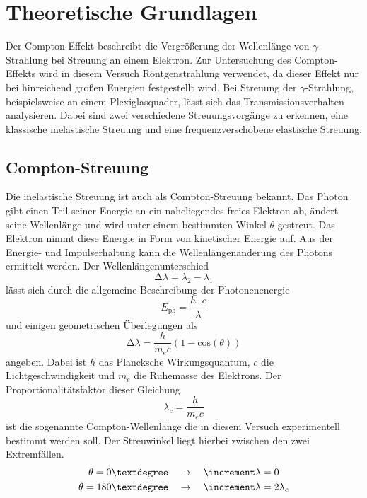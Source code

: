 \section{Theoretische Grundlagen}
Der Compton-Effekt beschreibt die Vergrößerung der Wellenlänge von $\gamma$-Strahlung bei Streuung an einem Elektron. Zur Untersuchung
des Compton-Effekts wird in diesem Versuch Röntgenstrahlung verwendet, da dieser Effekt nur bei hinreichend großen Energien festgestellt wird.
Bei Streuung der $\gamma$-Strahlung, beispielsweise an einem Plexiglasquader, lässt sich das Transmissionsverhalten analysieren. Dabei
sind zwei verschiedene Streuungsvorgänge zu erkennen, eine klassische inelastische Streuung und eine frequenzverschobene elastische Streuung.
\\
\subsection{Compton-Streuung}
Die inelastische Streuung ist auch als Compton-Streuung bekannt. Das Photon gibt einen Teil seiner Energie an ein naheliegendes freies Elektron ab, ändert seine Wellenlänge und wird unter einem 
bestimmten Winkel $\theta$ gestreut. Das Elektron nimmt diese Energie in Form von kinetischer Energie auf. Aus der Energie- und Impulserhaltung kann die Wellenlängenänderung des Photons ermittelt werden.
Der Wellenlängenunterschied
\begin{equation}
\label{eqn:diff}
\increment \lambda = \lambda_{2} - \lambda_{1}
\end{equation}
lässt sich durch die allgemeine Beschreibung der Photonenenergie
\begin{equation}
\label{eqn:photoneneq}
E_{\text{ph}} = \frac{h \cdot c}{\lambda}
\end{equation}
und einigen geometrischen Überlegungen als
\begin{equation}
\increment \lambda = \frac{h}{m_{e} c}(1-\text{cos}(\theta))
\end{equation}
angeben. Dabei ist $h$ das Plancksche Wirkungsquantum, $c$ die Lichtgeschwindigkeit und $m_{e}$ die Ruhemasse des Elektrons.
Der Proportionalitätsfaktor dieser Gleichung
\begin{equation}
\label{eqn:comptonwavelength}
\lambda_{c} = \frac{h}{m_{e} c}
\end{equation}
ist die sogenannte Compton-Wellenlänge die in diesem Versuch experimentell bestimmt werden soll. Der Streuwinkel liegt hierbei zwischen den
zwei Extremfällen. 
\begin{align*}
\theta = 0\textdegree \quad &\to \quad \increment \lambda = 0 \\
\theta = 180\textdegree \quad &\to \quad \increment \lambda = 2 \lambda_{c}
\end{align*}
